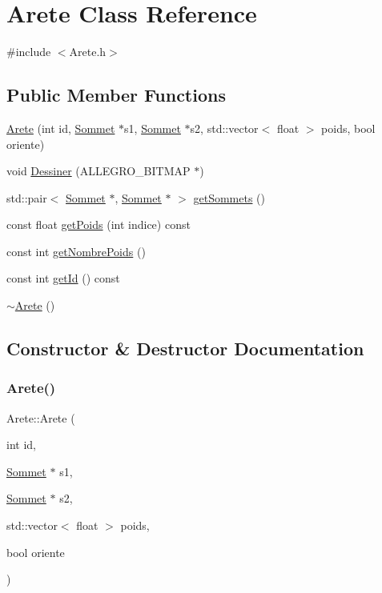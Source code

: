 \hypertarget{class_arete}{}\section{Arete Class Reference}
\label{class_arete}


{\ttfamily \#include $<$Arete.\+h$>$}

\subsection*{Public Member Functions}
\begin{DoxyCompactItemize}
\item 
\mbox{\hyperlink{class_arete_acb697d66a4eebd7c471d5280889faf3b}{Arete}} (int id, \mbox{\hyperlink{class_sommet}{Sommet}} $\ast$s1, \mbox{\hyperlink{class_sommet}{Sommet}} $\ast$s2, std\+::vector$<$ float $>$ poids, bool oriente)
\item 
void \mbox{\hyperlink{class_arete_af933957080e789335218ee0e5da5eed4}{Dessiner}} (A\+L\+L\+E\+G\+R\+O\+\_\+\+B\+I\+T\+M\+AP $\ast$)
\item 
std\+::pair$<$ \mbox{\hyperlink{class_sommet}{Sommet}} $\ast$, \mbox{\hyperlink{class_sommet}{Sommet}} $\ast$ $>$ \mbox{\hyperlink{class_arete_a92f3e0d045e6ec12c620944934bf9eab}{get\+Sommets}} ()
\item 
const float \mbox{\hyperlink{class_arete_a65ff1c3e69bae8336f85c4fc1c468f9b}{get\+Poids}} (int indice) const
\item 
const int \mbox{\hyperlink{class_arete_a78c1e560a06e83ee7eb1adfb690e63b2}{get\+Nombre\+Poids}} ()
\item 
const int \mbox{\hyperlink{class_arete_aeda0a1c10d9a9a52196e3c641f363646}{get\+Id}} () const
\item 
\mbox{\hyperlink{class_arete_a3abde319ff71a269b69e93f365262205}{$\sim$\+Arete}} ()
\end{DoxyCompactItemize}


\subsection{Constructor \& Destructor Documentation}
\mbox{\label{class_arete_acb697d66a4eebd7c471d5280889faf3b}} 
\subsubsection{\texorpdfstring{Arete()}{Arete()}}
{\footnotesize\ttfamily Arete\+::\+Arete (\begin{DoxyParamCaption}\item[{int}]{id,  }\item[{\mbox{\hyperlink{class_sommet}{Sommet}} $\ast$}]{s1,  }\item[{\mbox{\hyperlink{class_sommet}{Sommet}} $\ast$}]{s2,  }\item[{std\+::vector$<$ float $>$}]{poids,  }\item[{bool}]{oriente }\end{DoxyParamCaption})}

